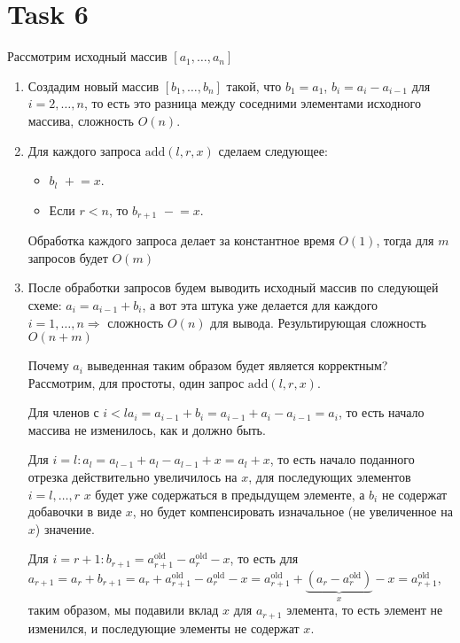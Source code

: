 \section{Task 6}
Рассмотрим исходный массив $[a_1, \ldots, a_n]$
\begin{enumerate}
    \item Создадим новый массив $[b_1, \ldots, b_n]$ такой, что $b_1 = a_1$, $b_i = a_i - a_{i-1}$ для $i=2,\ldots,n$, то есть это разница между соседними элементами исходного массива, сложность $O(n)$.
    \item Для каждого запроса $\text{add}(l,r,x)$ сделаем следующее:
    \begin{itemize}
        \item $b_l\,\,+\!\!= x$.
        \item Если $r<n$, то $b_{r+1} \,\, -\!\!= x$.
    \end{itemize}
    \begin{remark}
        Обработка каждого запроса делает за константное время $O(1)$, тогда для $m$ запросов будет $O(m)$
    \end{remark}
    \item После обработки запросов будем выводить исходный массив по следующей схеме: $a_i = a_{i-1} + b_i$, а вот эта штука уже делается для каждого $i=1,\ldots,n \Longrightarrow$ сложность $O(n)$ для вывода. Результирующая сложность $O(n + m)$
    \begin{remark}
        Почему $a_i$ выведенная таким образом будет является корректным? Рассмотрим, для простоты, один запрос $\text{add}(l,r,x)$.
        
        Для членов с $i<l a_i = a_{i-1} + b_i = a_{i-1} + a_i - a_{i-1} = a_i$, то есть начало массива не изменилось, как и должно быть.
        
        Для $i = l:a_l = a_{l-1} + a_{l} - a_{l-1} + x = a_l + x$, то есть начало поданного отрезка действительно увеличилось на $x$, для последующих элементов $i=l,\ldots,r$ $x$ будет уже содержаться в предыдущем элементе, а $b_i$ не содержат добавочки в виде $x$, но будет компенсировать изначальное (не увеличенное на $x$) значение.
        
        Для $i=r+1:b_{r+1} = a^{\text{old}}_{r+1} - a^{\text{old}}_{r} - x$, то есть для $a_{r+1} = a_r + b_{r+1} = a_r + a^{\text{old}}_{r+1} - a^{\text{old}}_r - x = a^{\text{old}}_{r+1} + \underbrace{(a_r - a^{\text{old}}_r)}_{x} - x = a^{\text{old}}_{r+1}$, таким образом, мы подавили вклад $x$ для $a_{r+1}$ элемента, то есть элемент не изменился, и последующие элементы не содержат $x$.
    \end{remark}
\end{enumerate}